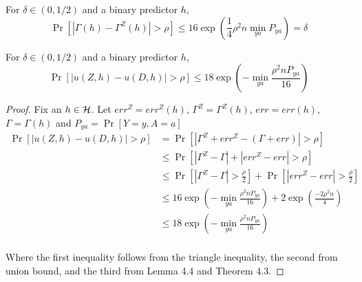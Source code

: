 \begin{lemma} For $\delta \in (0,1/2)$ and a binary predictor $h$,
	$$\Pr[|\Gamma(h) - \Gamma^Z(h)|>\rho ] \leq 16 \exp(\frac{1}{4}\rho^2n
	\min_{ya}{P_{ya}}) = \delta$$
\end{lemma}

\begin{lemma}
	For $\delta \in (0,1/2)$ and a binary predictor $h$,
	$$\Pr[|u(Z,h) - u(D,h)| > \rho] \leq 18\exp(-\min_{ya}{\frac{\rho^2 n
	P_{ya}}{16}})$$
\end{lemma}
\begin{proof}
	Fix an $h \in \mathcal{H}$. Let $err^Z = err^Z(h)$, $\Gamma^Z = \Gamma^Z(h)$, $err = err(h)$, $\Gamma = \Gamma(h)$ and $P_{ya} = \Pr[Y=y, A=a]$
	\begin{align*}
	\Pr[|u(Z,h) - u(D,h)| > \rho] & = \Pr[|\Gamma^Z + err^Z - (\Gamma +err) | > \rho]\\
	&\leq \Pr[|\Gamma^Z - \Gamma|  + |err^Z - err| > \rho]\\
	&\leq \Pr[|\Gamma^Z - \Gamma|> \frac{\rho}{2}]  + \Pr[|err^Z - err| > \frac{\rho}{2}]\\
	&\leq 16\exp(-\min_{ya}{\frac{\rho^2 n P_{ya}}{16}}) + 2\exp(\frac{-2\rho^2n}{4})\\
	&\leq 18\exp(-\min_{ya}{\frac{\rho^2 n P_{ya}}{16}})\\	
	\end{align*}
	
	Where the first inequality follows from the triangle inequality, the second from union bound, and the third from Lemma 4.4 and Theorem 4.3.
\end{proof}


